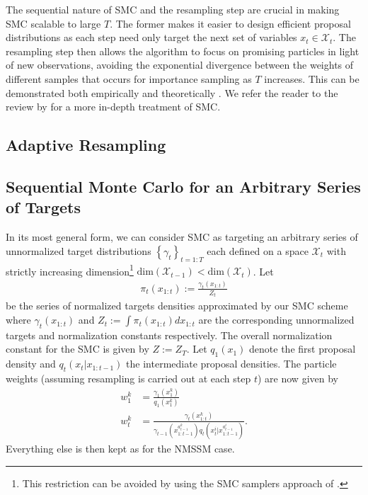 The sequential nature of SMC and the resampling step are crucial in making SMC scalable to large $T$.
The former makes it easier to design efficient proposal distributions as each step need only target 
the next set of variables $x_t \in \mathcal{X}_t$. 
The resampling step then allows the algorithm to focus on promising particles in light of new 
observations, avoiding the exponential divergence between the weights of different samples that 
occurs for importance sampling as $T$ increases.
This can be demonstrated both empirically and theoretically \citep[Chapter 9]{del2004feynman}.
We refer the reader to the review by \citet{doucet2009tutorial} for a more in-depth treatment of SMC.

\subsection{Adaptive Resampling}
\label{sec:part:smc:adapt-resam}


\subsection{Sequential Monte Carlo for an Arbitrary Series of Targets}
\label{sec:part:smc:arb}

In its most general form, we can consider SMC as targeting an arbitrary
series of unnormalized target distributions $\left\{\gamma_t\right\}_{t=1:T}$ each defined on a space
$\mathcal{X}_t$ with strictly increasing dimension\footnote{This restriction
	can be avoided by using the SMC samplers approach of \citet{del2006sequential}.}
$\mathrm{dim}(\mathcal{X}_{t-1})<\mathrm{dim}(\mathcal{X}_{t})$. 
Let
\begin{align}
\label{eq:part:norm-targets}
\pi_t(x_{1:t}) := \frac{\gamma_t(x_{1:t})}{Z_t}
\end{align}
be the series of normalized targets densities approximated by our SMC scheme
where $\gamma_t(x_{1:t})$ and $Z_t := \int \pi_t(x_{1:t}) dx_{1:t}$
are the corresponding unnormalized targets and normalization constants respectively.
The overall normalization constant for the SMC is given by $Z:=Z_T$.  
Let $q_1(x_1)$ denote the first proposal density and $q_t(x_t | x_{1:t - 1})$ 
the intermediate proposal densities.  The particle weights (assuming resampling is
carried out at each step $t$) are now given by
\begin{align}
w_1^k &= \frac{\gamma_1(x_1^k)}{q_1(x_1^k)} \\
w_t^k &= \frac{\gamma_t({x}_{1:t}^k)}{\gamma_{t - 1}({x}_{1:t - 1}^{a_{t - 1}^k}) q_t(x_t^i|x_{1:t-1}^{a_{t-1}^i})}.
\end{align}
Everything else is then kept as for the NMSSM case.

